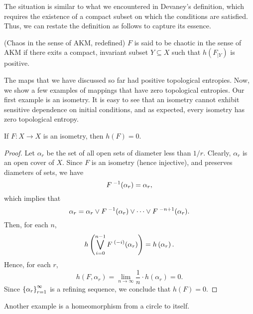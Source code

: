 \documentclass[10pt,twoside,draft]{book}
\begin{document}
The situation is similar to what we encountered in Devaney's definition, which requires the existence of a compact subset on which the conditions are satisfied.
Thus, we can restate the definition as follows to capture its essence.
\begin{definition}
  (Chaos in the sense of AKM, redefined)
  $F$ is said to be chaotic in the sense of AKM if there exits a compact, invariant subset $Y \subseteq X$ such that $h(F_{|Y})$ is positive.
\end{definition}

The maps that we have discussed so far had positive topological entropies.
Now, we show a few examples of mappings that have zero topological entropies.
Our first example is an isometry.
It is easy to see that an isometry cannot exhibit sensitive dependence on initial conditions, and as expected, every isometry has zero topological entropy.
\begin{proposition}
  \citep{akm}
  If $F: X \to X$ is an isometry, then $h(F) = 0$.
  \begin{proof}
    Let $\alpha_r$ be the set of all open sets of diameter less than $1/r$.
    Clearly, $\alpha_r$ is an open cover of $X$.
    Since $F$ is an isometry (hence injective), and preserves diameters of sets, we have
    \begin{equation*}
      F^{\;-1}(\alpha_r) = \alpha_r,
    \end{equation*}
    which implies that
    \begin{equation*}
      \alpha_r = \alpha_r \vee F^{\;-1}(\alpha_r) \vee \cdots \vee F^{\;-n+1}(\alpha_r).
    \end{equation*}
    Then, for each $n$,
    \begin{equation*}
      h\left (  \bigvee\limits_{i=0}^{n-1} F^{\;(-i)}(\alpha_r)  \right )   
      = h\left ( \alpha_r \right ).
    \end{equation*}
    Hence, for each $r$,
    \begin{equation*}
      h(F, \alpha_r)
      = \lim\limits_{n \to \infty} \frac{1}{n} \cdot h(\alpha_r)
      = 0.
    \end{equation*}
    Since $\left \{ \alpha_r \right \}^{\infty}_{r = 1}$ is a refining sequence, we conclude that $h(F) = 0$.
  \end{proof}
\end{proposition}
Another example is a homeomorphism from a circle to itself.
\end{document}
